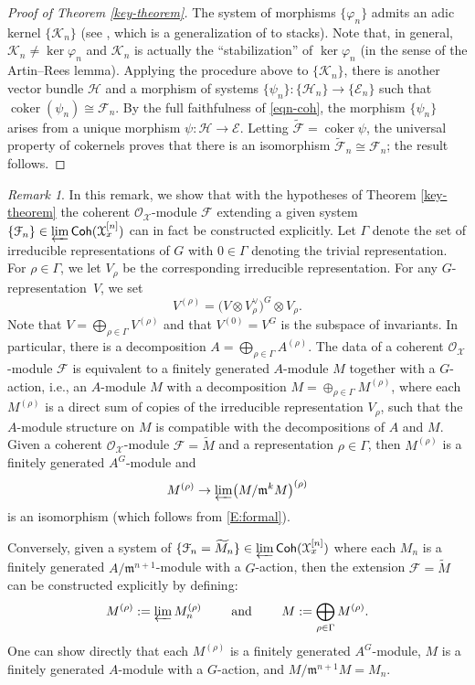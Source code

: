 \documentclass[a4paper]{amsart}
\theoremstyle{plain}
\theoremstyle{definition}
\theoremstyle{remark}
\newtheorem{remark}[theorem]{Remark}
\numberwithin{equation}{section}
\newcommand{\fm}{\mathfrak{m}}
\newcommand\cE{\mathcal{E}}
\newcommand\cF{\mathcal{F}}
\newcommand\cH{\mathcal{H}}
\newcommand\cX{\mathcal{X}}
\newcommand\oh{\mathcal{O}}
\newcommand\Coh{\mathsf{Coh}}
\newcommand{\ilim}{\varprojlim}
\renewcommand{\tilde}{\widetilde}
\newcommand{\shv}[1]{\mathcal{{#1}}}
\newcommand{\spref}[1]{\href{http://stacks.math.columbia.edu/tag/#1}{#1}}
\DeclareMathOperator{\coker}{coker}
\begin{document}
\begin{proof}[Proof of Theorem \ref{key-theorem}]
  The system of
  morphisms $\{\varphi_n\}$ admits an adic kernel $\{\shv{K}_n\}$ (see \cite[\S3.2]{hallj_dary_coherent_tannakian_duality}, which is a generalization of \cite[Tag \spref{087X}]{stacks-project} to stacks).  
Note that, in general, $\shv{K}_n \neq \ker \varphi_n$ and $\shv{K}_n$ is
  actually the ``stabilization'' of $\ker \varphi_n$ (in the sense of the
  Artin--Rees lemma). Applying the procedure above to $\{\shv{K}_n\}$,
  there is another vector bundle $\cH$ and a morphism of systems
  $\{\psi_n\} \colon \{\cH_n\} \to \{\cE_n\}$ such that
  $\coker(\psi_n) \cong \shv{F}_n$. By the full faithfulness of
  \eqref{eqn-coh}, the morphism $\{\psi_n\}$ arises from a unique
  morphism $\psi \colon \cH \to \cE$. Letting
  $\tilde{\shv{F}} = \coker \psi$, the universal property of cokernels
  proves that there is an isomorphism
  $\tilde{\shv{F}}_n \cong \shv{F}_n$; the result follows.
\end{proof}
\begin{remark} \label{R:explicit}
In this remark, we show that with the hypotheses of Theorem \ref{key-theorem} the coherent $\oh_{\cX}$-module $\cF$ extending a given system $\{\cF_n\} \in \ilim \Coh(\cX_x^{[n]})$ can in fact be constructed explicitly.  Let $\Gamma$ denote the set of irreducible representations of $G$ with $0 \in \Gamma$ denoting the trivial representation. 
For $\rho \in \Gamma$, we let $V_{\rho}$ be the corresponding irreducible representation.    
For any $G$-representation~$V$, we set
$$V^{(\rho)} = \bigl(V \otimes V_{\rho}^{\vee}\bigr)^G \otimes V_\rho.$$
Note that $V = \bigoplus_{\rho \in \Gamma} V^{(\rho)}$ and that $V^{(0)} = V^G$ is the subspace of invariants.  In particular, 
there is a decomposition $A = \bigoplus_{\rho \in \Gamma} A^{(\rho)}$.  The data of a coherent $\oh_{\cX}$-module $\cF$ is equivalent to a finitely generated $A$-module $M$ together with a $G$-action, 
i.e., an $A$-module $M$ with a decomposition $M = \oplus_{\rho \in \Gamma} M^{(\rho)}$, where each $M^{(\rho)}$ is a direct sum of copies of the irreducible representation $V_\rho$, such that the $A$-module structure on $M$ is compatible with the decompositions of $A$ and $M$.  Given a coherent $\oh_{\cX}$-module $\cF = \widetilde{M}$ and a representation $\rho \in \Gamma$, then $M^{(\rho)}$ is a finitely generated $A^G$-module and 
$$M^{(\rho)}  \to  \ilim \bigl(M/ \fm^{k} M\bigr)^{(\rho)}$$
is an isomorphism (which follows from \eqref{E:formal}).  

Conversely, given a system of 
$\{\cF_n = \widetilde{M}_n\} \in \ilim \Coh(\cX_x^{[n]})$ where each $M_n$ is a finitely generated $A / \fm^{n+1}$-module with a $G$-action, then the extension $\cF = \widetilde{M}$ can be constructed explicitly by defining:
$$M^{(\rho)} := \ilim M_n^{(\rho)} \qquad \text{ and } \qquad M := \bigoplus_{\rho \in \Gamma} M^{(\rho)}.$$
One can show directly that each $M^{(\rho)}$ is a finitely generated $A^G$-module, $M$ is a finitely generated $A$-module with a $G$-action, and $M/ \fm^{n+1} M = M_n$.
\end{remark}
\end{document}
